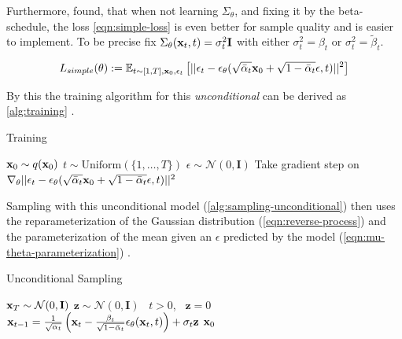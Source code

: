 Furthermore, \textcite{ddpm} found, that when not learning $\Sigma_\theta$, and fixing it by the beta-schedule, the loss \autoref{eqn:simple-loss} is even better for sample quality and is easier to implement.
To be precise \textcite{ddpm} fix $\Sigma_\theta(\mathbf{x}_t, t) = \sigma_t^2\mathbf{I}$ with either $\sigma_t^2 = \beta_t$ or $\sigma_t^2 = \tilde{\beta}_t$.

\begin{equation}
   \label{eqn:simple-loss}
   L_{simple}(\theta) := \mathbb{E}_{t \sim [1,T], \mathbf{x}_0, \epsilon_t}\left[ || \epsilon_t - \epsilon_\theta(\sqrt{\bar{\alpha}_t}\mathbf{x}_0 + \sqrt{1 - \bar{\alpha}_t} \epsilon,t)  ||^2 \right]
\end{equation}

By this the training algorithm for this \textit{unconditional} can be derived as \autoref{alg:training} \parencite{ddpm}.

\begin{algorithm}[htp!]
   \caption{Training \parencite{ddpm}}
   \label{alg:training}
   \begin{algorithmic}
      \Repeat
      \State $\mathbf{x}_0 \sim q(\mathbf{x}_0)$
      \State $t \sim \mathrm{Uniform}(\{1, \dots, T\})$
      \State $\epsilon \sim \mathcal{N}(0, \mathbf{I})$
      \State Take gradient step on $\nabla_\theta || \epsilon_t - \epsilon_\theta(\sqrt{\bar{\alpha}_t}\mathbf{x}_0 + \sqrt{1 - \bar{\alpha}_t} \epsilon,t) ||^2$
   \end{algorithmic}
\end{algorithm}



Sampling with this unconditional model (\autoref{alg:sampling-unconditional}) then uses the reparameterization of the Gaussian distribution (\autoref{eqn:reverse-process})
and the parameterization of the mean given an $\epsilon$ predicted by the model (\autoref{eqn:mu-theta-parameterization}) \parencite{ddpm}.


\begin{algorithm}[htp!]
   \caption{Unconditional Sampling \parencite{ddpm}}
   \label{alg:sampling-unconditional}
   \begin{algorithmic}
      \State $\mathbf{x}_T \sim \mathcal{N}(0, \mathbf{I})$
      \State $\mathbf{z} \sim \mathcal{N}(0, \mathbf{I})$ \algorithmicif\ $t > 0$, \algorithmicelse\ $\mathbf{z} = 0$
      \State $\mathbf{x}_{t-1} = \frac{1}{\sqrt{\alpha_t}} \left(\mathbf{x}_t - \frac{\beta_t}{\sqrt{1 - \bar{\alpha}_t}} \epsilon_\theta(\mathbf{x}_t, t) \right) + \sigma_t \mathbf{z}$
      \EndFor
      \Return $\mathbf{x}_0$
   \end{algorithmic}
\end{algorithm}

